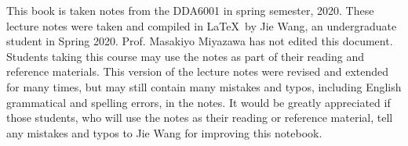 

%
%

%


\acknowledgments
This book is taken notes from the DDA6001 in spring semester, 2020. These lecture notes were taken and compiled in \LaTeX~by Jie Wang, an undergraduate student in Spring 2020. Prof. Masakiyo Miyazawa has not edited this document. Students taking this course may use the notes as part of their reading and reference materials. This version of the lecture notes were revised and extended for many times, but may still contain many mistakes and typos, including English grammatical and spelling errors, in the notes. It would be greatly appreciated if those students, who will use the notes as their reading or reference material, tell any mistakes and typos to Jie Wang for improving this notebook.




\mainmatter
\setcounter{page}{1}

